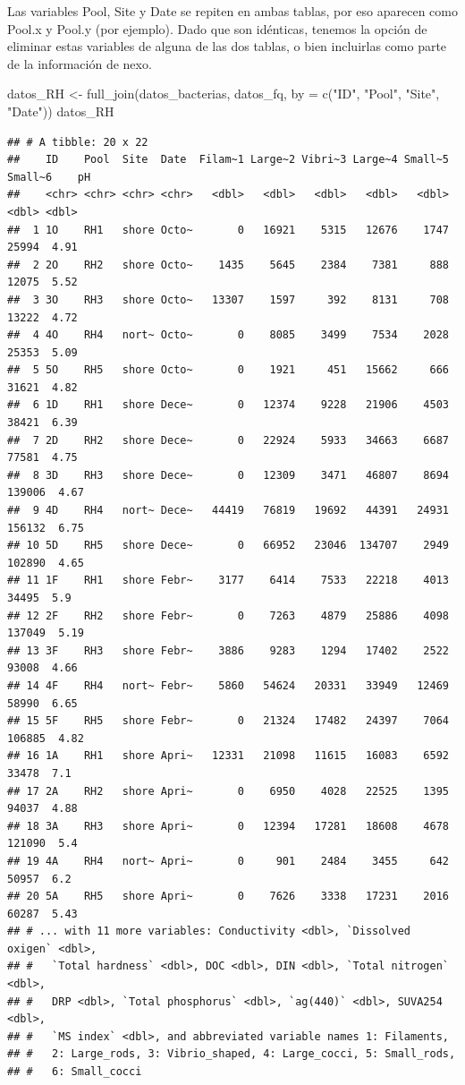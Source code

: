 \documentclass[
]{book}
\newenvironment{Shaded}{\begin{snugshade}}{\end{snugshade}}
\newcommand{\AttributeTok}[1]{\textcolor[rgb]{0.77,0.63,0.00}{#1}}
\newcommand{\FunctionTok}[1]{\textcolor[rgb]{0.00,0.00,0.00}{#1}}
\newcommand{\NormalTok}[1]{#1}
\newcommand{\OtherTok}[1]{\textcolor[rgb]{0.56,0.35,0.01}{#1}}
\newcommand{\StringTok}[1]{\textcolor[rgb]{0.31,0.60,0.02}{#1}}
\begin{document}
Las variables Pool, Site y Date se repiten en ambas tablas, por eso aparecen como Pool.x y Pool.y (por ejemplo). Dado que son idénticas, tenemos la opción de eliminar estas variables de alguna de las dos tablas, o bien incluirlas como parte de la información de nexo.

\begin{Shaded}
\begin{Highlighting}[]
\NormalTok{datos\_RH }\OtherTok{\textless{}{-}} \FunctionTok{full\_join}\NormalTok{(datos\_bacterias, datos\_fq, }\AttributeTok{by =} \FunctionTok{c}\NormalTok{(}\StringTok{"ID"}\NormalTok{, }\StringTok{"Pool"}\NormalTok{, }\StringTok{"Site"}\NormalTok{, }\StringTok{"Date"}\NormalTok{))}
\NormalTok{datos\_RH }
\end{Highlighting}
\end{Shaded}

\begin{verbatim}
## # A tibble: 20 x 22
##    ID    Pool  Site  Date  Filam~1 Large~2 Vibri~3 Large~4 Small~5 Small~6    pH
##    <chr> <chr> <chr> <chr>   <dbl>   <dbl>   <dbl>   <dbl>   <dbl>   <dbl> <dbl>
##  1 1O    RH1   shore Octo~       0   16921    5315   12676    1747   25994  4.91
##  2 2O    RH2   shore Octo~    1435    5645    2384    7381     888   12075  5.52
##  3 3O    RH3   shore Octo~   13307    1597     392    8131     708   13222  4.72
##  4 4O    RH4   nort~ Octo~       0    8085    3499    7534    2028   25353  5.09
##  5 5O    RH5   shore Octo~       0    1921     451   15662     666   31621  4.82
##  6 1D    RH1   shore Dece~       0   12374    9228   21906    4503   38421  6.39
##  7 2D    RH2   shore Dece~       0   22924    5933   34663    6687   77581  4.75
##  8 3D    RH3   shore Dece~       0   12309    3471   46807    8694  139006  4.67
##  9 4D    RH4   nort~ Dece~   44419   76819   19692   44391   24931  156132  6.75
## 10 5D    RH5   shore Dece~       0   66952   23046  134707    2949  102890  4.65
## 11 1F    RH1   shore Febr~    3177    6414    7533   22218    4013   34495  5.9 
## 12 2F    RH2   shore Febr~       0    7263    4879   25886    4098  137049  5.19
## 13 3F    RH3   shore Febr~    3886    9283    1294   17402    2522   93008  4.66
## 14 4F    RH4   nort~ Febr~    5860   54624   20331   33949   12469   58990  6.65
## 15 5F    RH5   shore Febr~       0   21324   17482   24397    7064  106885  4.82
## 16 1A    RH1   shore Apri~   12331   21098   11615   16083    6592   33478  7.1 
## 17 2A    RH2   shore Apri~       0    6950    4028   22525    1395   94037  4.88
## 18 3A    RH3   shore Apri~       0   12394   17281   18608    4678  121090  5.4 
## 19 4A    RH4   nort~ Apri~       0     901    2484    3455     642   50957  6.2 
## 20 5A    RH5   shore Apri~       0    7626    3338   17231    2016   60287  5.43
## # ... with 11 more variables: Conductivity <dbl>, `Dissolved oxigen` <dbl>,
## #   `Total hardness` <dbl>, DOC <dbl>, DIN <dbl>, `Total nitrogen` <dbl>,
## #   DRP <dbl>, `Total phosphorus` <dbl>, `ag(440)` <dbl>, SUVA254 <dbl>,
## #   `MS index` <dbl>, and abbreviated variable names 1: Filaments,
## #   2: Large_rods, 3: Vibrio_shaped, 4: Large_cocci, 5: Small_rods,
## #   6: Small_cocci
\end{verbatim}
\end{document}

